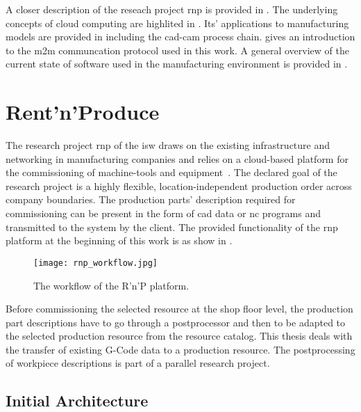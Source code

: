 \documentclass[
a4paper,
twoside,
headsepline,
cleardoublepage=empty,
parskip=half,
draft=false
]{scrbook}
\begin{document}
		A closer description of the reseach project \gls{rnp} is provided in .
		The underlying concepts of cloud computing are highlited in .
		Its' applications to manufacturing models are provided in  including the \gls{cad}-\gls{cam} process chain.
		 gives an introduction to the \gls{m2m} communcation protocol used in this work.
		A general overview of the current state of software used in the manufacturing environment is provided in .
	
		\section{Rent'n'Produce}\label{sec:rent_n_produce}
		
			The research project \gls{rnp} of the \gls{isw} draws on the existing infrastructure and networking in manufacturing companies and relies on a cloud-based platform for the commissioning of machine-tools and equipment~\cite{xen.17b}. The declared goal of the research project is a highly flexible, location-independent production order across company boundaries. The production parts' description required for commissioning can be present in the form of \gls{cad} data or \gls{nc} programs and transmitted to the system by the client. 
			The provided functionality of the \gls{rnp} platform at the beginning of this work is as show in .
			
			\begin{figure}[htbp]
				\centering
				\texttt{[image: rnp\_workflow.jpg]}
				\caption{The workflow of the R'n'P platform.}
				\label{fig:rnp_workflow}
			\end{figure}
			
			Before commissioning the selected resource at the shop floor level, the production part descriptions have to go through a postprocessor and then to be adapted to the selected production resource from the resource catalog.
			This thesis deals with the transfer of existing G-Code data to a production resource. 
			The postprocessing of workpiece descriptions is part of a parallel research project.
			
			\subsection{Initial Architecture}\label{subsec:initial_architecture}
			
\end{document}
